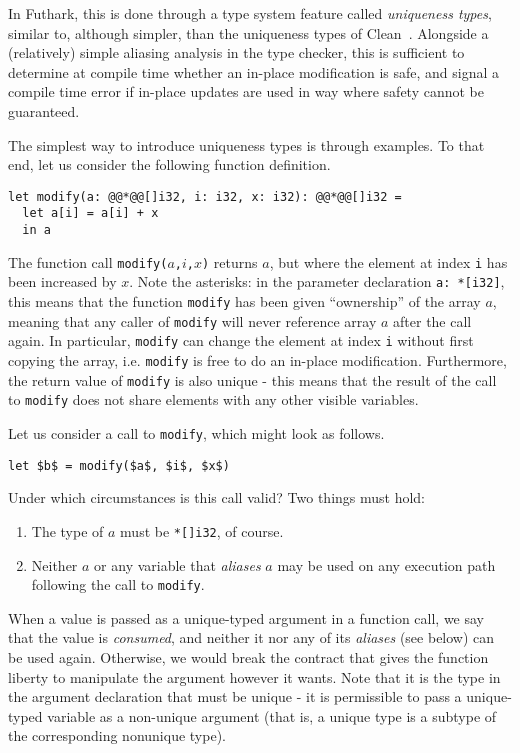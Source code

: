 \documentclass[oneside,11pt]{book}
\begin{document}
In Futhark, this is done through a type system feature called
\textit{uniqueness types}, similar to, although simpler, than the
uniqueness types of
Clean~\cite{clean-uniqueness-types,barendsen1996uniqueness}.
Alongside a (relatively) simple aliasing analysis in the type checker,
this is sufficient to determine at compile time whether an in-place
modification is safe, and signal a compile time error if in-place
updates are used in way where safety cannot be guaranteed.

The simplest way to introduce uniqueness types is through examples.
To that end, let us consider the following function definition.

\begin{lstlisting}
let modify(a: @@*@@[]i32, i: i32, x: i32): @@*@@[]i32 =
  let a[i] = a[i] + x
  in a
\end{lstlisting}

The function call \texttt{modify($a$,$i$,$x$)} returns $a$, but where
the element at index \texttt{i} has been increased by $x$.  Note the
asterisks: in the parameter declaration \texttt{a: *[i32]}, this means
that the function \texttt{modify} has been given ``ownership'' of the
array $a$, meaning that any caller of \texttt{modify} will never
reference array $a$ after the call again.  In particular,
\texttt{modify} can change the element at index \texttt{i} without
first copying the array, i.e. \texttt{modify} is free to do an
in-place modification.  Furthermore, the return value of
\texttt{modify} is also unique - this means that the result of the
call to \texttt{modify} does not share elements with any other visible
variables.

Let us consider a call to \texttt{modify}, which might look as
follows.

\begin{lstlisting}[mathescape=true]
let $b$ = modify($a$, $i$, $x$)
\end{lstlisting}

Under which circumstances is this call valid?  Two things must hold:
\begin{enumerate}
\item The type of \texttt{$a$} must be \texttt{*[]i32}, of course.

\item Neither \texttt{$a$} or any variable that \textit{aliases}
  \texttt{$a$} may be used on any execution path following the call to
  \texttt{modify}.
\end{enumerate}

When a value is passed as a unique-typed argument in a function call,
we say that the value is \textit{consumed}, and neither it nor any of
its \textit{aliases} (see below) can be used again.  Otherwise, we
would break the contract that gives the function liberty to manipulate
the argument however it wants.  Note that it is the type in the
argument declaration that must be unique - it is permissible to pass a
unique-typed variable as a non-unique argument (that is, a unique type
is a subtype of the corresponding nonunique type).
\end{document}
